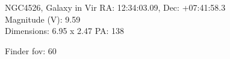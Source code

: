 \begin{block}{NGC4526, Galaxy in Vir}
    RA: 12:34:03.09, Dec: +07:41:58.3 \\ 
    Magnitude (V): 9.59 \\ 
    Dimensions: 6.95 x 2.47 PA: 138 

    Finder fov: 60 
\end{block}